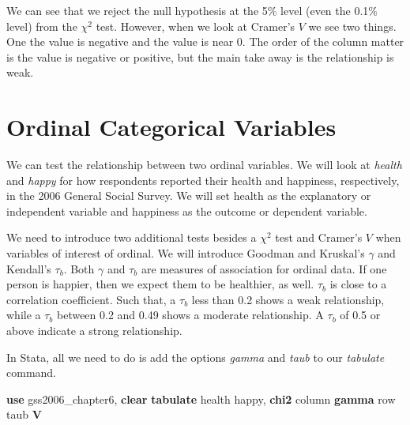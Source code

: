 \documentclass[
]{book}
\newenvironment{Shaded}{\begin{snugshade}}{\end{snugshade}}
\newcommand{\FunctionTok}[1]{\textcolor[rgb]{0.13,0.29,0.53}{\textbf{#1}}}
\newcommand{\KeywordTok}[1]{\textcolor[rgb]{0.13,0.29,0.53}{\textbf{#1}}}
\newcommand{\NormalTok}[1]{#1}
\newcommand{\OtherTok}[1]{\textcolor[rgb]{0.56,0.35,0.01}{#1}}
\begin{document}
We can see that we reject the null hypothesis at the 5\% level (even the 0.1\% level) from the \(\chi^2\) test. However, when we look at Cramer's \(V\) we see two things. One the value is negative and the value is near 0. The order of the column matter is the value is negative or positive, but the main take away is the relationship is weak.

\section{Ordinal Categorical Variables}\label{ordinal-categorical-variables}

We can test the relationship between two ordinal variables. We will look at \emph{health} and \emph{happy} for how respondents reported their health and happiness, respectively, in the 2006 General Social Survey. We will set health as the explanatory or independent variable and happiness as the outcome or dependent variable.

We need to introduce two additional tests besides a \(\chi^2\) test and Cramer's \(V\) when variables of interest of ordinal. We will introduce Goodman and Kruskal's \(\gamma\) and Kendall's \(\tau_{b}\). Both \(\gamma\) and \(\tau_{b}\) are measures of association for ordinal data. If one person is happier, then we expect them to be healthier, as well. \(\tau_b\) is close to a correlation coefficient. Such that, a \(\tau_b\) less than 0.2 shows a weak relationship, while a \(\tau_b\) between 0.2 and 0.49 shows a moderate relationship. A \(\tau_b\) of 0.5 or above indicate a strong relationship.

In Stata, all we need to do is add the options \emph{gamma} and \emph{taub} to our \emph{tabulate} command.

\begin{Shaded}
\begin{Highlighting}[]
\KeywordTok{use}\NormalTok{ gss2006\_chapter6, }\KeywordTok{clear}
\KeywordTok{tabulate}\NormalTok{ health happy, }\FunctionTok{chi2}\NormalTok{ column }\KeywordTok{gamma} \OtherTok{row}\NormalTok{ taub }\KeywordTok{V}
\end{Highlighting}
\end{Shaded}
\end{document}
